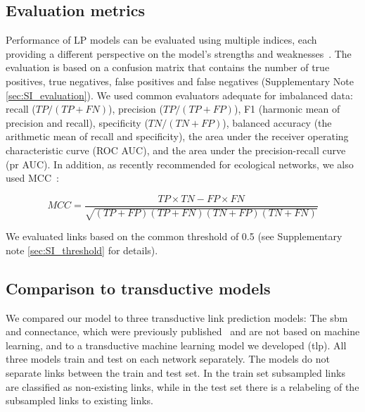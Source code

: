 \documentclass[oneside, a4paper, onecolumn, 11pt]{article}
\begin{document}
\begin{refsection}
\subsection*{Evaluation metrics} \label{sec:evaluation}

Performance of LP models can be evaluated using multiple indices, each providing a different perspective on the model's strengths and weaknesses~\autocite{Strydom2021-aq,Poisot2023-di}. The evaluation is based on a confusion matrix that contains the number of true positives, true negatives, false positives and false negatives (Supplementary Note \ref{sec:SI_evaluation}). We used common evaluators adequate for imbalanced data: recall (${TP}/{(TP+FN)}$), precision (${TP}/{(TP+FP)}$), F1 (harmonic mean of precision and recall), specificity (${TN}/{(TN+FP)}$), balanced accuracy (the arithmetic mean of recall and specificity), the area under the receiver operating characteristic curve (ROC AUC), and the area under the precision-recall curve (\ac{pr} AUC). In addition, as recently recommended for ecological networks, we also used MCC~\autocite{Poisot2023-di}:

\begin{equation}
    MCC=\frac{TP \times TN - FP \times FN}{\sqrt{(TP+FP)(TP+FN)(TN+FP)(TN+FN)}}
\end{equation}

We evaluated links based on the common threshold of 0.5  (see Supplementary note \ref{sec:SI_threshold} for details).

\subsection*{Comparison to transductive models}
We compared our model to three transductive link prediction models: The \ac{sbm} and connectance, which were previously published~\autocite{Terry2020-wv} and are not based on machine learning, and to a transductive machine learning model we developed (\ac{tlp}). All three models train and test on each network separately. The models do not separate links between the train and test set. In the train set subsampled links are classified as non-existing links, while in the test set there is a relabeling of the subsampled links to existing links.


\end{refsection}
\end{document}

